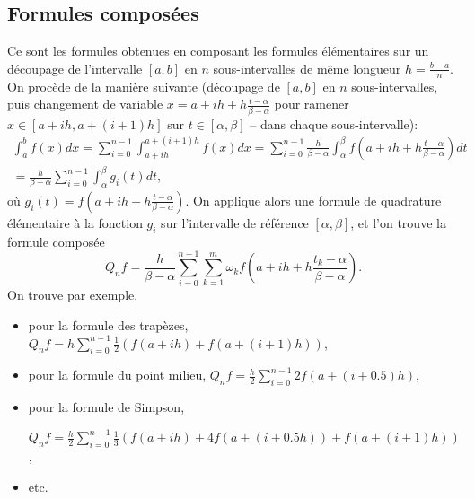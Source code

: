 \documentclass[a4paper,11pt,twoside]{article}
\begin{document}
\subsection*{Formules composées}
Ce sont les formules obtenues en composant les formules élémentaires sur
un découpage de l'intervalle $[a,b]$ en $n$ sous-intervalles de même
longueur $h = \frac{b-a}n$. On procède de la manière suivante (découpage
de $[a,b]$ en $n$ sous-intervalles, puis changement de variable
$x = a+ih+h\frac{t-\alpha}{\beta-\alpha}$ pour ramener
$x \in [a+ih, a+(i+1)h]$ sur $t \in [\alpha,\beta]$ -- dans chaque
sous-intervalle):
\begin{multline*}
  \int_a^b f(x)dx = \sum_{i=0}^{n-1} \int_{a+ih}^{a+(i+1)h} f(x)dx =
  \sum_{i=0}^{n-1} \frac{h}{\beta-\alpha} \int_\alpha^\beta f\left(
    a+ih+h\frac{t-\alpha}{\beta-\alpha} \right) dt \\ =
  \frac{h}{\beta-\alpha} \sum_{i=0}^{n-1} \int_\alpha^\beta g_i(t)dt,
\end{multline*}
où $g_i(t) = f\left( a+ih+h\frac{t-\alpha}{\beta-\alpha} \right)$. On
applique alors une formule de quadrature élémentaire à la fonction $g_i$
sur l'intervalle de référence $[\alpha,\beta]$, et l'on trouve la
formule composée
\begin{equation*}
  Q_nf = \frac{h}{\beta-\alpha} \sum_{i=0}^{n-1} \sum_{k=1}^m \omega_k
  f\left( a+ih+h\frac{t_k-\alpha}{\beta-\alpha} \right).
\end{equation*}
On trouve par exemple,
\begin{itemize}
\item pour la formule des trapèzes,
  $Q_nf = h\sum_{i=0}^{n-1} \frac12\left( f(a+ih)+f(a+(i+1)h) \right)$,
\item pour la formule du point milieu,
  $Q_nf = \frac{h}2 \sum_{i=0}^{n-1} 2f(a+(i+0.5)h)$,
\item pour la formule de Simpson,

  $Q_nf = \frac{h}2 \sum_{i=0}^{n-1} \frac13\left( f(a+ih) +
    4f(a+(i+0.5h)) + f(a+(i+1)h) \right)$,
\item etc.
\end{itemize}
\end{document}
